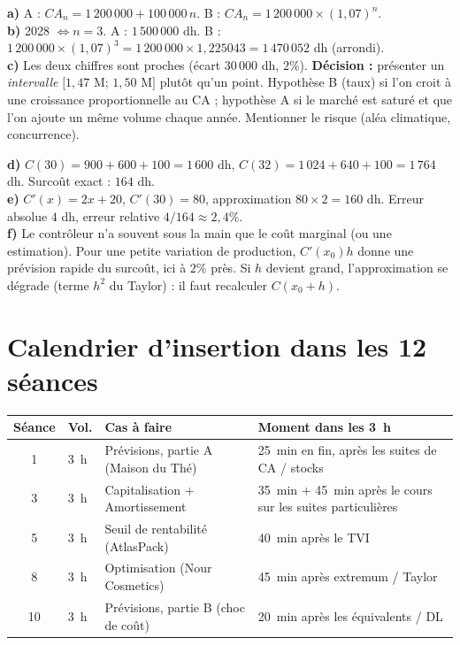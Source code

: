 \documentclass[12pt,a4paper]{article}
\renewcommand{\arraystretch}{1.25}
\begin{document}
\begin{corrigebox}[Partie A]
\textbf{a)} A : $CA_n=1\,200\,000+100\,000\,n$. B : $CA_n=1\,200\,000\times(1{,}07)^n$.\\
\textbf{b)} 2028 $\Leftrightarrow n=3$. A : $1\,500\,000$ dh. B : $1\,200\,000\times(1{,}07)^3=1\,200\,000\times 1{,}225043=1\,470\,052$ dh (arrondi).\\
\textbf{c)} Les deux chiffres sont proches (écart $30\,000$ dh, $2\%$). \textbf{Décision :} présenter un \emph{intervalle} $[1{,}47$ M$;\,1{,}50$ M$]$ plutôt qu'un point. Hypothèse B (taux) si l'on croit à une croissance proportionnelle au CA ; hypothèse A si le marché est saturé et que l'on ajoute un même volume chaque année. Mentionner le risque (aléa climatique, concurrence).
\end{corrigebox}

\begin{corrigebox}[Partie B]
\textbf{d)} $C(30)=900+600+100=1\,600$ dh, $C(32)=1\,024+640+100=1\,764$ dh. Surcoût exact : $164$ dh.\\
\textbf{e)} $C'(x)=2x+20$, $C'(30)=80$, approximation $80\times 2=160$ dh. Erreur absolue $4$ dh, erreur relative $4/164 \approx 2{,}4\%$.\\
\textbf{f)} Le contrôleur n'a souvent sous la main que le coût marginal (ou une estimation). Pour une petite variation de production, $C'(x_0)h$ donne une prévision rapide du surcoût, ici à $2\%$ près. Si $h$ devient grand, l'approximation se dégrade (terme $h^2$ du Taylor) : il faut recalculer $C(x_0+h)$.
\end{corrigebox}

\section{Calendrier d'insertion dans les 12 séances}

\begin{center}
\renewcommand{\arraystretch}{1.15}
\begin{tabular}{@{}clp{}p{}@{}}
\toprule
\textbf{Séance} & \textbf{Vol.} & \textbf{Cas à faire} & \textbf{Moment dans les 3~h} \\
\midrule
1 & 3~h & Prévisions, partie A (Maison du Thé) & 25~min en fin, après les suites de CA / stocks \\
3 & 3~h & Capitalisation + Amortissement & 35~min + 45~min après le cours sur les suites particulières \\
5 & 3~h & Seuil de rentabilité (AtlasPack) & 40~min après le TVI \\
8 & 3~h & Optimisation (Nour Cosmetics) & 45~min après extremum / Taylor \\
10 & 3~h & Prévisions, partie B (choc de coût) & 20~min après les équivalents / DL \\
\bottomrule
\end{tabular}
\end{center}
\end{document}

